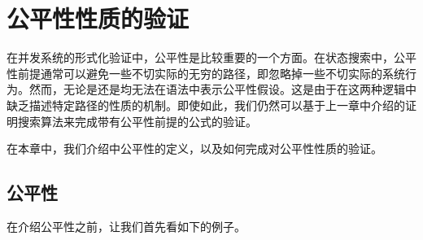 
\chapter{公平性性质的验证}\label{chapt:fairness}

在并发系统的形式化验证中，公平性是比较重要的一个方面。在状态搜索中，公平性前提通常可以避免一些不切实际的无穷的路径，即忽略掉一些不切实际的系统行为\cite{BaierKatoen08}。然而，无论是\CTL{}还是\CTLP{}均无法在语法中表示公平性假设。这是由于在这两种逻辑中缺乏描述特定路径的性质的机制。即使如此，我们仍然可以基于上一章中介绍的证明搜索算法来完成带有公平性前提的\CTLP{}公式的验证。




在本章中，我们介绍\CTLP{}中公平性的定义，以及如何完成对公平性性质的验证。

\section{公平性}
在介绍公平性之前，让我们首先看如下的例子。

